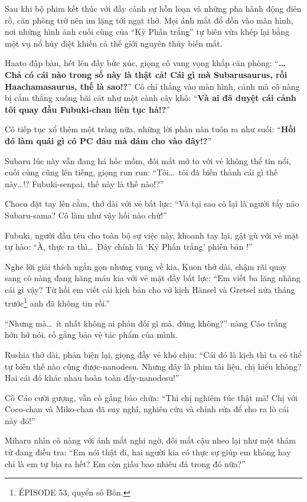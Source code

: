 \documentclass[../main.tex]{subfiles}
\begin{document}
Sau khi bộ phim kết thúc với đầy cảnh sự hỗn loạn và những pha hành động điên rồ, căn phòng trở nên im lặng tới ngạt thở. Mọi ánh mắt đổ dồn vào màn hình, nơi những hình ảnh cuối cùng của ``Kỷ Phấn trắng'' tự biên vừa khép lại bằng một vụ nổ hủy diệt khiến cả thế giới nguyên thủy biến mất.

Haato đập bàn, hét lên đầy bức xúc, giọng cô vang vọng khắp căn phòng: ``\textbf{\dots  Chả có cái nào trong số này là thật cả! Cái gì mà Subarusaurus, rồi Haachamasaurus, thế là sao!?}'' Cô chỉ thẳng vào màn hình, cảnh mà cô nàng bị cắm thẳng xuống bãi cát như một cành cây khô: ``\textbf{Và ai đã duyệt cái cảnh tôi quay đầu Fubuki-chan liên tục hả!?}''

Cô tiếp tục xổ thêm một tràng nữa, những lời phàn nàn tuôn ra như suối: ``\textbf{Hồi đó làm quái gì có PC đâu mà dám cho vào đây!?}''

Subaru lúc này vẫn đang há hốc mồm, đôi mắt mở to với vẻ không thể tin nổi, cuối cùng cũng lên tiếng, giọng run run: ``Tôi\dots\ tôi đã biến thành cái gì thế này\dots!? Fubuki-senpai, thế này là thế nào!?''

Choco đặt tay lên cằm, thở dài với vẻ bất lực: ``Và tại sao cô lại là người tẩy não Subaru-sama? Cô làm như vậy hồi nào chứ!''

Fubuki, người đầu têu cho toàn bộ sự việc này, khoanh tay lại, gật gù với vẻ mặt tự hào: ``À, thực ra thì\dots\ Đây chính là `Kỷ Phấn trắng' phiên bản \hll!''

Nghe lời giải thích ngắn gọn nhưng vụng về kia, Kuon thở dài, chậm rãi quay sang cô nàng đang hăng máu kia với vẻ mặt đầy bất lực: ``Em viết ba lăng nhăng cái gì vậy? Từ hồi em viết cái kịch bản cho vở kịch Hänsel và Gretsel nửa tháng trước\footnote{{\flaregothic ÉPISODE 53}, quyển số Bốn.} anh đã không tin rồi.''

``Nhưng mà\dots\ ít nhất không ai phản đối gì mà, đúng không?'' nàng Cáo trắng hớn hở nói, cố gắng bảo vệ tác phẩm của mình.

Rushia thở dài, phản biện lại, giọng đầy vẻ khó chịu: ``Cái đó là kịch thì ta có thể tự biên thế nào cũng được-nanodesu. Nhưng đây là phim tài liệu, chị hiểu không? Hai cái đó khác nhau hoàn toàn đấy-nanodesu!''

Cô Cáo cười gượng, vẫn cố gắng bào chữa: ``Thì chị nghiêm túc thật mà! Chị với Coco-chan và Miko-chan đã suy nghĩ, nghiên cứu và chỉnh sửa để cho ra lò cái này đó!''

Miharu nhìn cô nàng với ánh mắt nghi ngờ, đôi mắt cậu nheo lại như một thám tử đang điều tra: ``Em nói thật đi, hai người kia có thực sự giúp em không hay chỉ là em tự bịa ra hết? Em còn giấu bao nhiêu đá trong đó nữa?''
\end{document}
